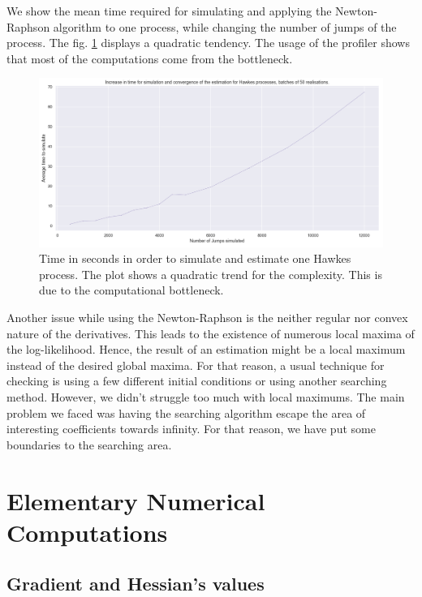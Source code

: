 We show the mean time required for simulating and applying the Newton-Raphson algorithm to one process, while changing the number of jumps of the process. The fig. \ref{fig:complex} displays a quadratic tendency. The usage of the profiler shows that most of the computations come from the bottleneck.  

\begin{figure}
\centering
\includegraphics[width = 0.90 \textwidth]{../imag/chap2/complexity.png}
\caption{Time in seconds in order to simulate and estimate one Hawkes process. The plot shows a quadratic trend for the complexity. This is due to the computational bottleneck.}
\label{fig:complex}
\end{figure}

Another issue while using the Newton-Raphson is the neither regular nor convex nature of the derivatives. This leads to the existence of numerous local maxima of the log-likelihood. Hence, the result of an estimation might be a local maximum instead of the desired global maxima. For that reason, a usual technique for checking is using a few different initial conditions or using another searching method. However, we didn't struggle too much with local maximums. The main problem we faced was having the searching algorithm escape the area of interesting coefficients towards infinity. For that reason, we have put some boundaries to the searching area.















\section{Elementary Numerical Computations}
\subsection{Gradient and Hessian's values}
\label{subsection_R_def}

